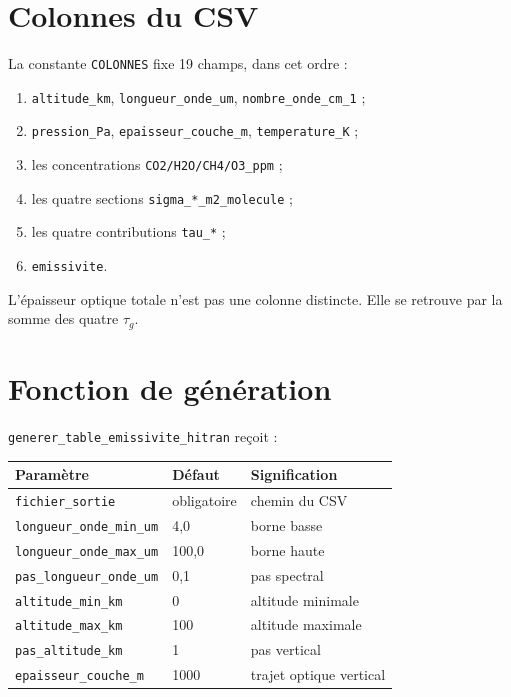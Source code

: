 \documentclass[11pt,a4paper]{article}
\begin{document}
\section{Colonnes du CSV}

La constante \texttt{COLONNES} fixe 19 champs, dans cet ordre :

\begin{enumerate}
  \item \texttt{altitude\_km}, \texttt{longueur\_onde\_um},
        \texttt{nombre\_onde\_cm\_1} ;
  \item \texttt{pression\_Pa}, \texttt{epaisseur\_couche\_m},
        \texttt{temperature\_K} ;
  \item les concentrations \texttt{CO2/H2O/CH4/O3\_ppm} ;
  \item les quatre sections \texttt{sigma\_*\_m2\_molecule} ;
  \item les quatre contributions \texttt{tau\_*} ;
  \item \texttt{emissivite}.
\end{enumerate}

L'épaisseur optique totale n'est pas une colonne distincte. Elle se retrouve
par la somme des quatre $\tau_g$.

\section{Fonction de génération}

\texttt{generer\_table\_emissivite\_hitran} reçoit :

\begin{center}
\small
\begin{tabular}{lll}
\toprule
Paramètre & Défaut & Signification \\
\midrule
\texttt{fichier\_sortie} & obligatoire & chemin du CSV \\
\texttt{longueur\_onde\_min\_um} & 4,0 & borne basse \\
\texttt{longueur\_onde\_max\_um} & 100,0 & borne haute \\
\texttt{pas\_longueur\_onde\_um} & 0,1 & pas spectral \\
\texttt{altitude\_min\_km} & 0 & altitude minimale \\
\texttt{altitude\_max\_km} & 100 & altitude maximale \\
\texttt{pas\_altitude\_km} & 1 & pas vertical \\
\texttt{epaisseur\_couche\_m} & 1000 & trajet optique vertical \\
\bottomrule
\end{tabular}
\end{center}
\end{document}
